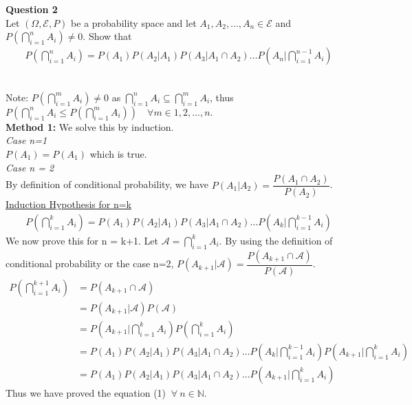 \documentclass[addpoints]{exam}
\begin{document}
\begin{questions}
\begin{solution}
\end{solution}
\newpage
\question \textbf{ Question 2}\\
Let \((\Omega,\mathcal{E},P)\) be a probability space and let \(A_1,A_2,\dots,A_n \in \mathcal{E}\)
and \(P(\bigcap_{i=1}^{n}A_i)\neq 0\). Show that 
\begin{align}
   P(\bigcap_{i=1}^{n}A_i) = P(A_1)P(A_2|A_1)P(A_3|A_1\cap A_2)\dots P(A_n|\bigcap_{i=1}^{n-1}A_i)
\end{align}
\begin{solution}\\
    Note: \(P(\bigcap_{i=1}^{m}A_i) \neq 0\) as \( \bigcap_{i=1}^{n}A_i \subseteq \bigcap_{i=1}^{m}A_i\), 
    thus \(P(\bigcap_{i=1}^{n}A_i\leq P(\bigcap_{i=1}^{m}A_i))\quad \forall m \in {1,2,\dots,n}.\)\\[5]
    \textbf{Method 1:}  
    We solve this by induction. \\[3] 
    \emph{Case n=1} \\ 
    \(P(A_1) = P(A_1)\) which is true.\\
    \emph{Case n = 2}\\ 
    By definition of conditional probability, we have \(P(A_1|A_2) = \dfrac{P(A_1\cap A_2)}{P(A_2)}\).\\
    \underline{Induction Hypothesis for n=k}
    \begin{align}
       P(\bigcap_{i=1}^{k}A_i) = P(A_1)P(A_2|A_1)P(A_3|A_1\cap A_2)\dots P(A_k|\bigcap_{i=1}^{k-1}A_i)
    \end{align}
    We now prove this for n = k+1. Let \(\mathcal{A} = \bigcap_{i=1}^{k}A_i\). By using the definition of
    conditional probability or the case n=2, \(P(A_{k+1}|\mathcal{A}) = \dfrac{P(A_{k+1}\cap \mathcal{A})}{P(\mathcal{A})}\).
    \begin{align*}
        P(\bigcap_{i=1}^{k+1}A_i) &= P(A_{k+1}\cap\mathcal{A})\\ 
                                  &=P(A_{k+1}|\mathcal{A})P(\mathcal{A})\\
                                  &= P(A_{k+1}|\bigcap_{i=1}^{k}A_i)P(\bigcap_{i=1}^{k}A_i)\\
        \tag{Using Induction Hypothesis}
                                  &=P(A_1)P(A_2|A_1)P(A_3|A_1\cap A_2)\dots P(A_k|\bigcap_{i=1}^{k-1}A_i)P(A_{k+1}|\bigcap_{i=1}^{k}A_i)\\ 
                                  &=P(A_1)P(A_2|A_1)P(A_3|A_1\cap A_2)\dots P(A_{k+1}|\bigcap_{i=1}^{k}A_i)
    \end{align*}
    Thus we have proved the equation (1) \(~ \forall~ n\in\mathbb{N}\).\\[5]

\end{solution}
\end{questions}
\end{document}

